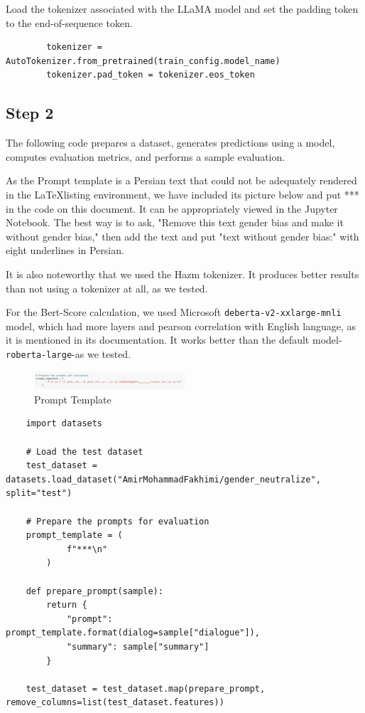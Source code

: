 \documentclass{solutionclass} %
\begin{document}
\begin{solution}
	Load the tokenizer associated with the LLaMA model and set the padding token to the end-of-sequence token.
	\begin{lstlisting}
		tokenizer = AutoTokenizer.from_pretrained(train_config.model_name)
		tokenizer.pad_token = tokenizer.eos_token
	\end{lstlisting}
\end{solution}


\subsection*{Step 2}

The following code prepares a dataset, generates predictions using a model, computes evaluation metrics, and performs a sample evaluation.

As the Prompt template is a Persian text that could not be adequately rendered in the \LaTeX listing environment, we have included its picture below and put *** in the code on this document. It can be appropriately viewed in the Jupyter Notebook. The best way is to ask, "Remove this text gender bias and make it without gender bias," then add the text and put "text without gender bias:" with eight underlines in Persian.

It is also noteworthy that we used the Hazm tokenizer. It produces better results than not using a tokenizer at all, as we tested.

For the Bert-Score calculation, we used Microsoft \verb|deberta-v2-xxlarge-mnli| model, which had more layers and pearson correlation with English language, as it is mentioned in its documentation. It works better than the default model-\verb|roberta-large|-as we tested.





\begin{figure}[h!]
	\caption{Prompt Template}
	\centering
	\includegraphics[width=0.5\textwidth]{img/Prompt.png}
\end{figure}



\begin{lstlisting}
	import datasets

	# Load the test dataset
	test_dataset = datasets.load_dataset("AmirMohammadFakhimi/gender_neutralize", split="test")
	
	# Prepare the prompts for evaluation
	prompt_template = (
			f"***\n"
		)
	
	def prepare_prompt(sample):
		return {
			"prompt": prompt_template.format(dialog=sample["dialogue"]),
			"summary": sample["summary"]
		}
	
	test_dataset = test_dataset.map(prepare_prompt, remove_columns=list(test_dataset.features))
\end{lstlisting}
\end{document}
